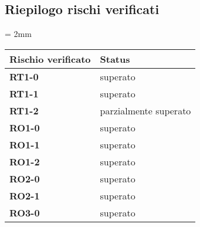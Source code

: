 \subsection{Riepilogo rischi verificati}
    \tabulinesep = 2mm %
    \begin{longtabu} to \textwidth {| X[0.1,c m] | X[0.1,c m] |} %
        \hline

        \textbf{Rischio verificato} & \textbf{Status} \\
        \hline

        \textbf{RT1-0} & superato\\
        \hline 
        \textbf{RT1-1} & superato\\
        \hline
        \textbf{RT1-2} & parzialmente superato\\
        \hline
        \textbf{RO1-0} & superato \\ 
        \hline
        \textbf{RO1-1} & superato \\ 
        \hline
        \textbf{RO1-2} & superato \\ 
        \hline
        \textbf{RO2-0} & superato \\ 
        \hline
        \textbf{RO2-1} & superato \\ 
        \hline
        \textbf{RO3-0} & superato \\ 
        \hline

    \end{longtabu}
